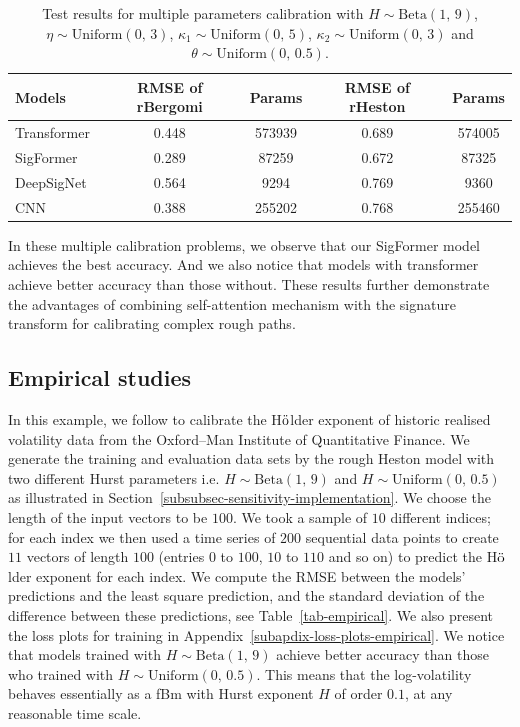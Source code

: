 \documentclass[]{article}
\renewcommand{\(}{\left(}
\renewcommand{\)}{\right)}
\begin{document}
	\begin{table}[H]
		\caption{Test results for multiple parameters calibration with $H\sim\text{Beta}(1,\,9)$, $\eta\sim\text{Uniform}(0,\,3)$, $\kappa_1\sim\text{Uniform}(0,\,5)$, $\kappa_2\sim\text{Uniform}(0,\,3)$ and $\theta\sim\text{Uniform}(0,\,0.5)$.}
		\label{tab-multiple-two}
		\smallskip
		\centering
		\renewcommand\arraystretch{1.5}
		\begin{tabular}{l c c | c c}
			\toprule
			Models&RMSE of rBergomi&Params&RMSE of rHeston&Params\\
			\hline
			Transformer&0.448&573939&0.689&574005\\
			\hline
			SigFormer&0.289&87259&0.672&87325\\
			\hline
			DeepSigNet&0.564&9294&0.769&9360\\
			\hline
			CNN&0.388&255202&0.768&255460\\
			\bottomrule
		\end{tabular}
	\end{table}
	
	 In these multiple calibration problems, we observe that our SigFormer model achieves the best accuracy. And we also notice that models with transformer achieve better accuracy than those without. These results further demonstrate the advantages of combining self-attention mechanism with the signature transform for calibrating complex rough paths.
		
	\subsection{Empirical studies}
	\label{subsec-empirical}
	In this example, we follow \cite{stone_2020} to calibrate the H$\ddot{\rm o}$lder exponent of historic realised volatility data from the Oxford–Man Institute of Quantitative Finance. We generate the training and evaluation data sets by the rough Heston model with two different Hurst parameters i.e. $H\sim\text{Beta}(1,\,9)$ and $H\sim\text{Uniform}(0,\,0.5)$ as illustrated in Section~\ref{subsubsec-sensitivity-implementation}. We choose the length of the input vectors to be $100$. We took a sample of $10$ different indices; for each index we then used a time series of $200$ sequential data points to create $11$ vectors of length $100$ (entries $0$ to $100$, $10$ to $110$ and so on) to predict the H$\ddot{\rm o}$lder exponent for each index. We compute the RMSE between the models' predictions and the least square prediction, and the standard deviation of the difference between these predictions, see Table~\ref{tab-empirical}. We also present the loss plots for training in Appendix~\ref{subapdix-loss-plots-empirical}. We notice that models trained with $H\sim\text{Beta}(1,\,9)$ achieve better accuracy than those who trained with $H\sim\text{Uniform}(0,\,0.5)$. This means that the log-volatility behaves essentially as a fBm with Hurst exponent $H$ of order $0.1$, at any reasonable time scale.
	
\end{document}
